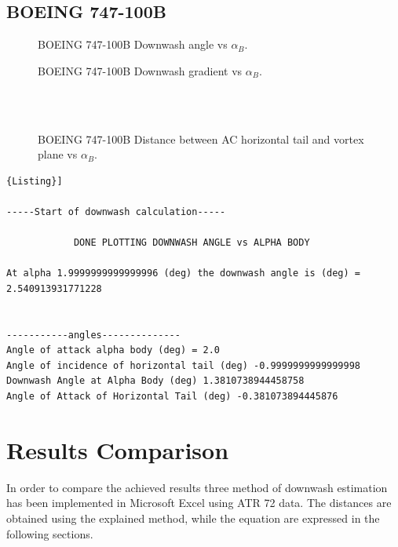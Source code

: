 \subsection{BOEING 747-100B}
\begin{figure}[H]
\centering

\caption{BOEING 747-100B Downwash angle vs $\alpha_{B}$.}
\label{fig:epsilonboeing}
\end{figure}

\begin{figure}[H]
\centering

\caption{BOEING 747-100B  Downwash gradient vs $\alpha_{B}$.}
\label{fig:downwashgradboeing}
\end{figure}

\noindent \\ \\ 

\begin{figure}[H]
\centering

\caption{BOEING 747-100B  Distance between AC horizontal tail and vortex plane vs $\alpha_{B}$.}
\label{fig:zboeing}
\end{figure}

\newpage

\begin{lstlisting}[caption={{\footnotesize Downwash estimation - Results. BOEING 747-100B}},label= [style=\bfseries]{Listing}]

-----Start of downwash calculation-----

			DONE PLOTTING DOWNWASH ANGLE vs ALPHA BODY

At alpha 1.9999999999999996 (deg) the downwash angle is (deg) = 2.540913931771228

 
-----------angles-------------- 
Angle of attack alpha body (deg) = 2.0
Angle of incidence of horizontal tail (deg) -0.9999999999999998
Downwash Angle at Alpha Body (deg) 1.3810738944458758
Angle of Attack of Horizontal Tail (deg) -0.381073894445876
\end{lstlisting}

\section{Results Comparison}

In order to compare the achieved results three method of downwash estimation has been implemented in Microsoft Excel using ATR 72 data. The distances are obtained using the explained method, while the equation are expressed in the following sections.



